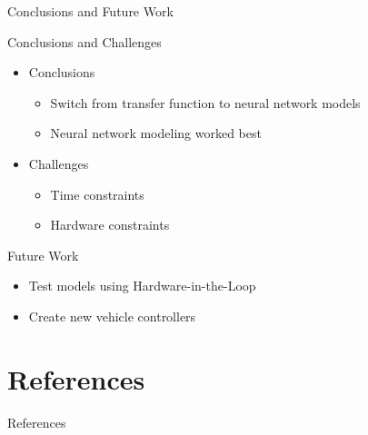 \documentclass{beamer}
\begin{document}
\begin{frame}{Conclusions and Future Work}
  \begin{block}{Conclusions and Challenges}
    \begin{itemize}
      \item Conclusions
      \begin{itemize}
      	\item Switch from transfer function to neural network models
      	\item Neural network modeling worked best 
      \end{itemize}
      \item Challenges
        \begin{itemize}
      	\item Time constraints 
      	\item Hardware constraints 
      \end{itemize}
    \end{itemize}
  \end{block}
  \begin{block}{Future Work}
    \begin{itemize}
      \item Test models using Hardware-in-the-Loop
      \item Create new vehicle controllers 
    \end{itemize}
  \end{block}
\end{frame}


\section{References}

\begin{frame}{References}
  
  
\end{frame}

\end{document}
